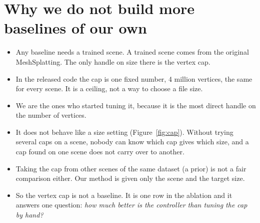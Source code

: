 \documentclass[10pt]{article}
\begin{document}
\section{Why we do not build more baselines of our own}
\begin{itemize}
\item Any baseline needs a trained scene. A trained scene comes from the original MeshSplatting. The only handle on size there is the vertex cap.
\item In the released code the cap is one fixed number, 4 million vertices, the same for every scene. It is a ceiling, not a way to choose a file size.
\item We are the ones who started tuning it, because it is the most direct handle on the number of vertices.
\item It does not behave like a size setting (Figure~\ref{fig:cap}). Without trying several caps on a scene, nobody can know which cap gives which size, and a cap found on one scene does not carry over to another.
\item Taking the cap from other scenes of the same dataset (a prior) is not a fair comparison either. Our method is given only the scene and the target size.
\item So the vertex cap is not a baseline. It is one row in the ablation and it answers one question: \emph{how much better is the controller than tuning the cap by hand?}
\end{itemize}
\end{document}

